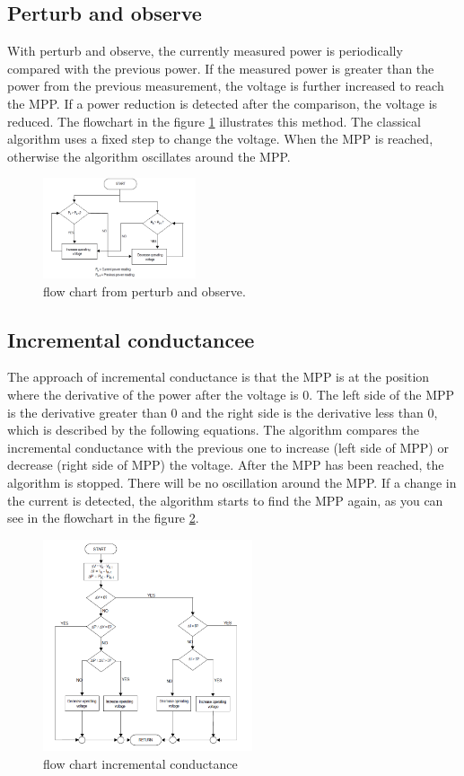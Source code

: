 \subsection{Perturb and observe}
With perturb and observe, the currently measured power is periodically compared with the previous power. If the measured power is greater than the power from the previous measurement, the voltage is further increased to reach the MPP. If a power reduction is detected after the comparison, the voltage is reduced. The flowchart in the figure \ref{fcperturbandobserve} illustrates this method. The classical algorithm uses a fixed step to change the voltage. When the MPP is reached, otherwise the algorithm oscillates around the MPP.

\begin{figure}[htbp]
	\begin{center}
		\includegraphics[width=0.4\textwidth]{../Pictures/P1/Flow_chart/flow_chart_perturb_observe}
		\caption{flow chart from perturb and observe.}
		\label{fcperturbandobserve}
	\end{center}	
\end{figure}

\subsection{Incremental conductancee}
The approach of incremental conductance is that the MPP is at the position where the derivative of the power after the voltage is 0. The left side of the MPP is the derivative greater than 0 and the right side is the derivative less than 0, which is described by the following equations. The algorithm compares the incremental conductance with the previous one to increase (left side of MPP) or decrease (right side of MPP) the voltage.  After the MPP has been reached, the algorithm is stopped. There will be no oscillation around the MPP. If a change in the current is detected, the algorithm starts to find the MPP again, as you can see in the flowchart in the figure \ref{fcinccon}.

\begin{figure}[H]
	\begin{center}
		\includegraphics[width=0.55\textwidth]{../Pictures/P1/Flow_chart/flow_chart_incremental_conductance}
		\caption{flow chart incremental conductance }
		\label{fcinccon}
	\end{center}	
\end{figure}